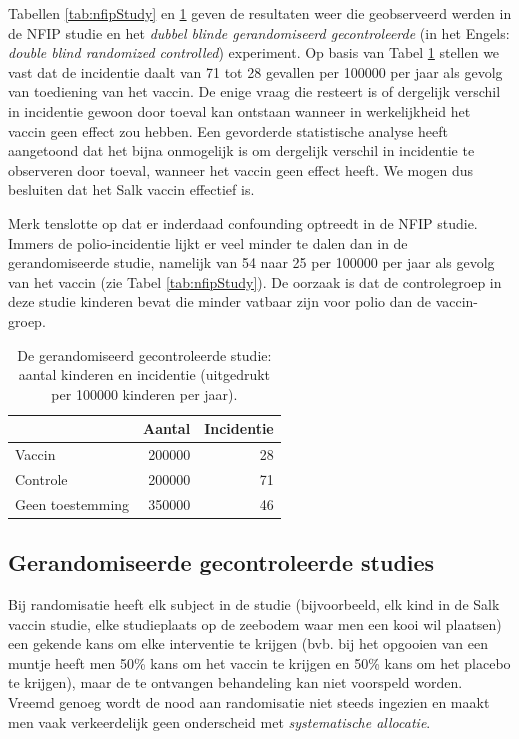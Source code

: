 \documentclass[
  12pt,dutch,coursenotes]{book}
\theoremstyle{definition}
\theoremstyle{definition}
\theoremstyle{definition}
\theoremstyle{definition}
\theoremstyle{remark}
\begin{document}
Tabellen \ref{tab:nfipStudy} en \ref{tab:dbrcStudy} geven de resultaten weer die geobserveerd
werden in de NFIP studie en het \emph{dubbel blinde gerandomiseerd
gecontroleerde} (in het Engels: \emph{double blind randomized controlled})
experiment. Op basis van Tabel \ref{tab:dbrcStudy} stellen we vast dat de incidentie
daalt van 71 tot 28 gevallen per 100000 per jaar als gevolg van
toediening van het vaccin. De enige vraag die resteert is of dergelijk
verschil in incidentie gewoon door toeval kan ontstaan wanneer in
werkelijkheid het vaccin geen effect zou hebben. Een gevorderde statistische analyse heeft aangetoond dat het bijna onmogelijk is om dergelijk verschil in incidentie
te observeren door toeval, wanneer het vaccin geen effect heeft. We mogen
dus besluiten dat het Salk vaccin effectief is.

Merk tenslotte op dat er inderdaad confounding optreedt in de NFIP studie. Immers
de polio-incidentie lijkt er veel minder te dalen dan in de gerandomiseerde studie, namelijk van 54 naar 25
per 100000 per jaar als gevolg van het vaccin (zie Tabel \ref{tab:nfipStudy}). De oorzaak is dat
de controlegroep in deze studie kinderen bevat die minder vatbaar zijn voor
polio dan de vaccin-groep.

\begin{table}

\caption{\label{tab:dbrcStudy}De gerandomiseerd gecontroleerde studie: aantal kinderen en incidentie (uitgedrukt per
100000 kinderen per jaar).}
\centering
\begin{tabular}[t]{lrr}
\toprule
  & Aantal & Incidentie\\
\midrule
Vaccin & 200000 & 28\\
Controle & 200000 & 71\\
Geen toestemming & 350000 & 46\\
\bottomrule
\end{tabular}
\end{table}

\hypertarget{gerandomiseerde-gecontroleerde-studies}{%
\subsection{Gerandomiseerde gecontroleerde studies}\label{gerandomiseerde-gecontroleerde-studies}}

Bij randomisatie heeft elk subject in de studie (bijvoorbeeld, elk kind in de Salk vaccin studie, elke studieplaats op de zeebodem waar men een kooi wil plaatsen) een gekende kans om elke interventie te krijgen (bvb. bij het opgooien van een muntje heeft men 50\% kans om het
vaccin te krijgen en 50\% kans om het placebo te krijgen), maar de te
ontvangen behandeling kan niet voorspeld worden. Vreemd genoeg wordt de nood
aan randomisatie niet steeds ingezien en maakt men vaak verkeerdelijk geen
onderscheid met \emph{systematische allocatie}.
\end{document}
